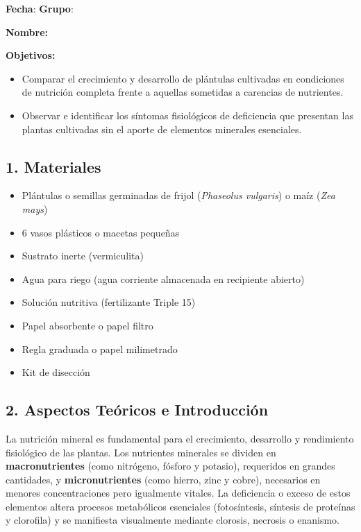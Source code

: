 \documentclass[
  spanish,
  10pt,
  letterpaper,
  twocolumn]{article}
\title{\vspace{-1.5em}{\Huge \textbf{Práctica No.~6 -- Nutrición
Mineral}}\vspace{-1.5em}}
\date{}
\providecommand{\tightlist}{%
  \setlength{\itemsep}{0pt}\setlength{\parskip}{0pt}}
\begin{document}
\maketitle


\textbf{Fecha}: \hrulefill \hfill \textbf{Grupo}: \hrulefill

\textbf{Nombre:} \hrulefill

\textbf{Objetivos:}

\begin{itemize}
\tightlist
\item
  Comparar el crecimiento y desarrollo de plántulas cultivadas en
  condiciones de nutrición completa frente a aquellas sometidas a
  carencias de nutrientes.
\item
  Observar e identificar los síntomas fisiológicos de deficiencia que
  presentan las plantas cultivadas sin el aporte de elementos minerales
  esenciales.
\end{itemize}

\subsection{1. Materiales}\label{materiales}

\begin{itemize}
\tightlist
\item
  Plántulas o semillas germinadas de frijol (\emph{Phaseolus vulgaris})
  o maíz (\emph{Zea mays})
\item
  6 vasos plásticos o macetas pequeñas
\item
  Sustrato inerte (vermiculita)
\item
  Agua para riego (agua corriente almacenada en recipiente abierto)
\item
  Solución nutritiva (fertilizante Triple 15)
\item
  Papel absorbente o papel filtro
\item
  Regla graduada o papel milimetrado
\item
  Kit de disección
\end{itemize}

\subsection{2. Aspectos Teóricos e
Introducción}\label{aspectos-teuxf3ricos-e-introducciuxf3n}

La nutrición mineral es fundamental para el crecimiento, desarrollo y
rendimiento fisiológico de las plantas. Los nutrientes minerales se
dividen en \textbf{macronutrientes} (como nitrógeno, fósforo y potasio),
requeridos en grandes cantidades, y \textbf{micronutrientes} (como
hierro, zinc y cobre), necesarios en menores concentraciones pero
igualmente vitales. La deficiencia o exceso de estos elementos altera
procesos metabólicos esenciales (fotosíntesis, síntesis de proteínas y
clorofila) y se manifiesta visualmente mediante clorosis, necrosis o
enanismo.
\end{document}
